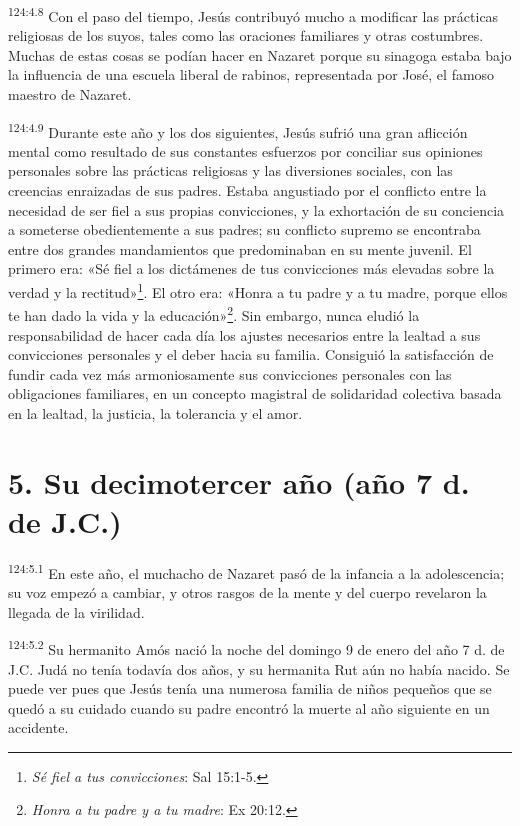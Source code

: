 \par 
\textsuperscript{124:4.8} Con el paso del tiempo, Jesús contribuyó mucho a modificar las prácticas religiosas de los suyos, tales como las oraciones familiares y otras costumbres. Muchas de estas cosas se podían hacer en Nazaret porque su sinagoga estaba bajo la influencia de una escuela liberal de rabinos, representada por José, el famoso maestro de Nazaret.

\par 
\textsuperscript{124:4.9} Durante este año y los dos siguientes, Jesús sufrió una gran aflicción mental como resultado de sus constantes esfuerzos por conciliar sus opiniones personales sobre las prácticas religiosas y las diversiones sociales, con las creencias enraizadas de sus padres. Estaba angustiado por el conflicto entre la necesidad de ser fiel a sus propias convicciones, y la exhortación de su conciencia a someterse obedientemente a sus padres; su conflicto supremo se encontraba entre dos grandes mandamientos que predominaban en su mente juvenil. El primero era: «Sé fiel a los dictámenes de tus convicciones más elevadas sobre la verdad y la rectitud»\footnote{\textit{Sé fiel a tus convicciones}: Sal 15:1-5.}. El otro era: «Honra a tu padre y a tu madre, porque ellos te han dado la vida y la educación»\footnote{\textit{Honra a tu padre y a tu madre}: Ex 20:12.}. Sin embargo, nunca eludió la responsabilidad de hacer cada día los ajustes necesarios entre la lealtad a sus convicciones personales y el deber hacia su familia. Consiguió la satisfacción de fundir cada vez más armoniosamente sus convicciones personales con las obligaciones familiares, en un concepto magistral de solidaridad colectiva basada en la lealtad, la justicia, la tolerancia y el amor.

\section*{5. Su decimotercer año (año 7 d. de J.C.)}
\par 
\textsuperscript{124:5.1} En este año, el muchacho de Nazaret pasó de la infancia a la adolescencia; su voz empezó a cambiar, y otros rasgos de la mente y del cuerpo revelaron la llegada de la virilidad.

\par 
\textsuperscript{124:5.2} Su hermanito Amós nació la noche del domingo 9 de enero del año 7 d. de J.C. Judá no tenía todavía dos años, y su hermanita Rut aún no había nacido. Se puede ver pues que Jesús tenía una numerosa familia de niños pequeños que se quedó a su cuidado cuando su padre encontró la muerte al año siguiente en un accidente.

